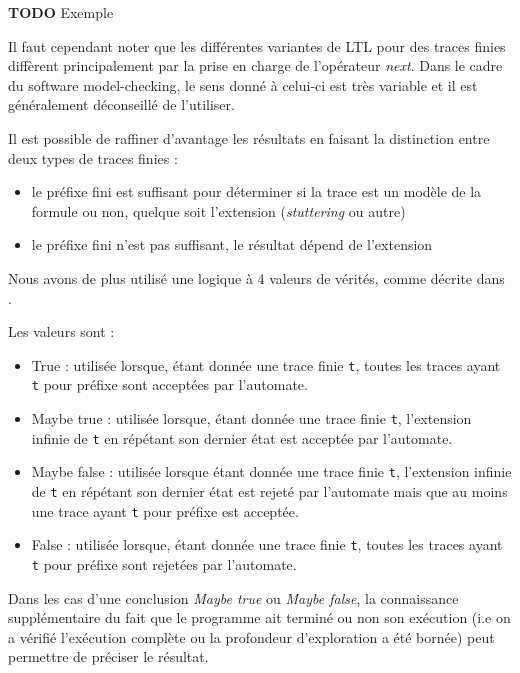 \textbf{TODO} Exemple

Il faut cependant noter que les différentes variantes de LTL pour des
traces finies diffèrent principalement par la prise en charge de
l'opérateur \emph{next}. Dans le cadre du software model-checking, le
sens donné à celui-ci est très variable et il est généralement
déconseillé de l'utiliser.

Il est possible de raffiner d'avantage les résultats en faisant la
distinction entre deux types de traces finies :

\begin{itemize}
\item
  le préfixe fini est suffisant pour déterminer si la trace est un
  modèle de la formule ou non, quelque soit l'extension
  (\emph{stuttering} ou autre)
\item
  le préfixe fini n'est pas suffisant, le résultat dépend de l'extension
\end{itemize}

Nous avons de plus utilisé une logique à 4 valeurs de vérités, comme
décrite dans \cite{morse_ltl}.

Les valeurs sont :

\begin{itemize}
\item
  True : utilisée lorsque, étant donnée une trace finie \lstinline!t!,
  toutes les traces ayant \lstinline!t! pour préfixe sont acceptées par
  l'automate.
\item
  Maybe true : utilisée lorsque, étant donnée une trace finie
  \lstinline!t!, l'extension infinie de \lstinline!t! en répétant son
  dernier état est acceptée par l'automate.
\item
  Maybe false : utilisée lorsque étant donnée une trace finie
  \lstinline!t!, l'extension infinie de \lstinline!t! en répétant son
  dernier état est rejeté par l'automate mais que au moins une trace
  ayant \lstinline!t! pour préfixe est acceptée.
\item
  False : utilisée lorsque, étant donnée une trace finie \lstinline!t!,
  toutes les traces ayant \lstinline!t! pour préfixe sont rejetées par
  l'automate.
\end{itemize}

Dans les cas d'une conclusion \emph{Maybe true} ou \emph{Maybe false},
la connaissance supplémentaire du fait que le programme ait terminé ou
non son exécution (i.e on a vérifié l'exécution complète ou la
profondeur d'exploration a été bornée) peut permettre de préciser le
résultat.

